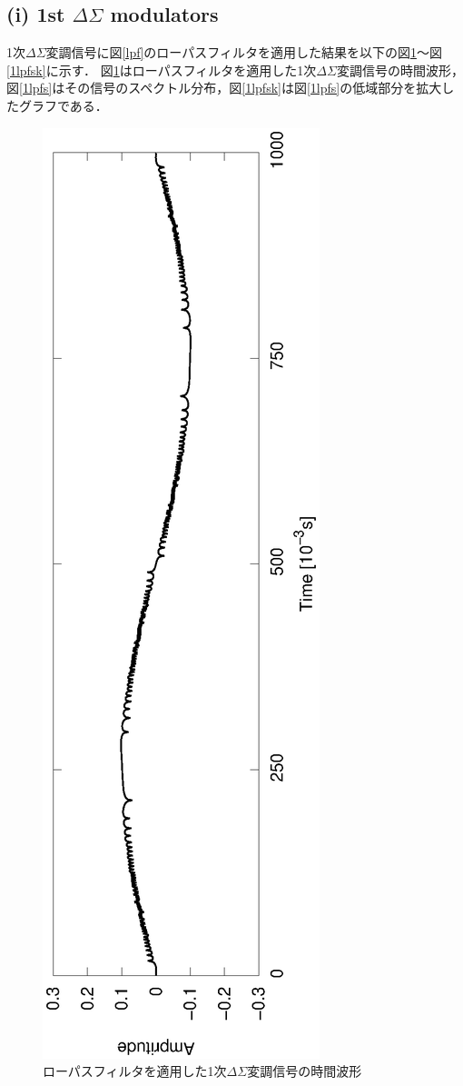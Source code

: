 \documentclass[a4j]{jsarticle}
\begin{document}
\subsection*{(i) 1st $\Delta\Sigma$ modulators}
1次$\Delta\Sigma$変調信号に図\ref{lpf}のローパスフィルタを適用した結果を以下の図\ref{1lpft}〜図\ref{1lpfsk}に示す．
図\ref{1lpft}はローパスフィルタを適用した1次$\Delta\Sigma$変調信号の時間波形，図\ref{1lpfs}はその信号のスペクトル分布，図\ref{1lpfsk}は図\ref{1lpfs}の低域部分を拡大したグラフである．
\begin{figure}[H]
 \centering
 \vspace{-3.5cm}
 \hspace{-2cm}
 \includegraphics[angle=-90,scale=0.6]{1stout_LPF_time.eps}
 \vspace{-2cm}
 \caption{ローパスフィルタを適用した1次$\Delta\Sigma$変調信号の時間波形}
 \label{1lpft}
\end{figure}
\end{document}
